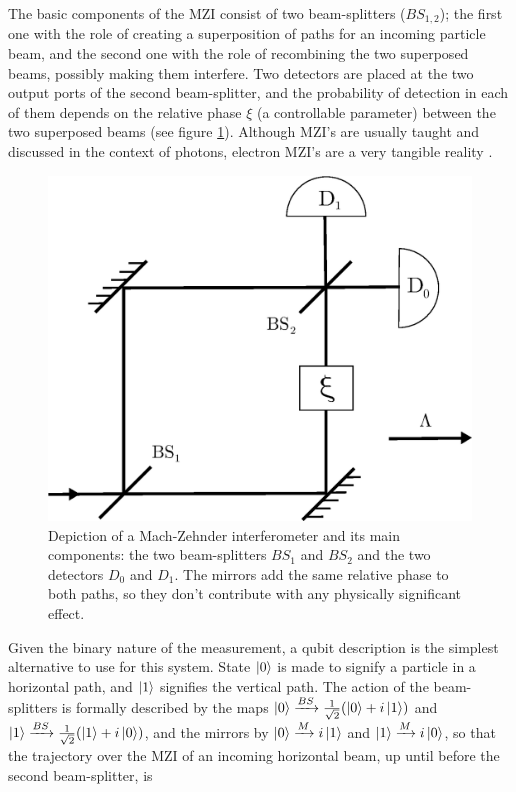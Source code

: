 \documentclass[12pt,a4paper,notitlepage]{report}
\begin{document}
The basic components of the MZI consist of two beam-splitters ($BS_{1,2}$); the first one with the role of creating a superposition of paths for an incoming particle beam, and the second one with the role of recombining the two superposed beams, possibly making them interfere. Two detectors are placed at the two output ports of the second beam-splitter, and the probability of detection in each of them depends on the relative phase $\xi$ (a controllable parameter) between the two superposed beams (see figure \ref{mzi}). Although MZI's are usually taught and discussed in the context of photons, electron MZI's are a very tangible reality \cite{ji_2003}.

\begin{figure}[t]
  \centering
  \includegraphics[scale=.45]{../Figuras/mach-zehnder-xi.eps}
  \captionsetup{font=footnotesize, margin=8pt}
  \caption{Depiction of a Mach-Zehnder interferometer and its main components: the two beam-splitters $BS_1$ and $BS_2$ and the two detectors $D_0$ and $D_1$. The mirrors add the same relative phase to both paths, so they don't contribute with any physically significant effect.}
  \label{mzi}
\end{figure}

Given the binary nature of the measurement, a qubit description is the simplest alternative to use for this system. State $\ket{0}$ is made to signify a particle in a horizontal path, and $\ket{1}$ signifies the vertical path. The action of the beam-splitters is formally described by the maps $\ket{0} \xrightarrow{BS} \frac{1}{\sqrt{2}}(\ket{0}+i\ket{1})$ and $\ket{1} \xrightarrow{BS} \frac{1}{\sqrt{2}}(\ket{1}+i\ket{0})$, and the mirrors by $\ket{0}\xrightarrow{M}i\ket{1}$ and $\ket{1}\xrightarrow{M}i\ket{0}$, so that the trajectory over the MZI of an incoming horizontal beam, up until before the second beam-splitter, is
\end{document}
